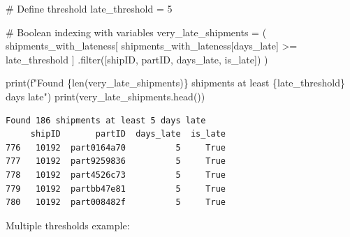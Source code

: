 \documentclass[
  letterpaper,
  DIV=11,
  numbers=noendperiod]{scrartcl}
\newenvironment{Shaded}{\begin{snugshade}}{\end{snugshade}}
\newcommand{\BuiltInTok}[1]{\textcolor[rgb]{0.00,0.23,0.31}{#1}}
\newcommand{\CommentTok}[1]{\textcolor[rgb]{0.37,0.37,0.37}{#1}}
\newcommand{\DecValTok}[1]{\textcolor[rgb]{0.68,0.00,0.00}{#1}}
\newcommand{\NormalTok}[1]{\textcolor[rgb]{0.00,0.23,0.31}{#1}}
\newcommand{\OperatorTok}[1]{\textcolor[rgb]{0.37,0.37,0.37}{#1}}
\newcommand{\SpecialCharTok}[1]{\textcolor[rgb]{0.37,0.37,0.37}{#1}}
\newcommand{\SpecialStringTok}[1]{\textcolor[rgb]{0.13,0.47,0.30}{#1}}
\newcommand{\StringTok}[1]{\textcolor[rgb]{0.13,0.47,0.30}{#1}}
\begin{document}
\begin{Shaded}
\begin{Highlighting}[]
\CommentTok{\# Define threshold}
\NormalTok{late\_threshold }\OperatorTok{=} \DecValTok{5}

\CommentTok{\# Boolean indexing with variables}
\NormalTok{very\_late\_shipments }\OperatorTok{=}\NormalTok{ (}
\NormalTok{    shipments\_with\_lateness[}
\NormalTok{        shipments\_with\_lateness[}\StringTok{\textquotesingle{}days\_late\textquotesingle{}}\NormalTok{] }\OperatorTok{\textgreater{}=}\NormalTok{ late\_threshold}
\NormalTok{    ]}
\NormalTok{    .}\BuiltInTok{filter}\NormalTok{([}\StringTok{\textquotesingle{}shipID\textquotesingle{}}\NormalTok{, }\StringTok{\textquotesingle{}partID\textquotesingle{}}\NormalTok{, }\StringTok{\textquotesingle{}days\_late\textquotesingle{}}\NormalTok{, }\StringTok{\textquotesingle{}is\_late\textquotesingle{}}\NormalTok{])}
\NormalTok{)}

\BuiltInTok{print}\NormalTok{(}\SpecialStringTok{f"Found }\SpecialCharTok{\{}\BuiltInTok{len}\NormalTok{(very\_late\_shipments)}\SpecialCharTok{\}}\SpecialStringTok{ shipments at least }\SpecialCharTok{\{}\NormalTok{late\_threshold}\SpecialCharTok{\}}\SpecialStringTok{ days late"}\NormalTok{)}
\BuiltInTok{print}\NormalTok{(very\_late\_shipments.head())}
\end{Highlighting}
\end{Shaded}

\begin{verbatim}
Found 186 shipments at least 5 days late
     shipID       partID  days_late  is_late
776   10192  part0164a70          5     True
777   10192  part9259836          5     True
778   10192  part4526c73          5     True
779   10192  partbb47e81          5     True
780   10192  part008482f          5     True
\end{verbatim}

Multiple thresholds example:
\end{document}
